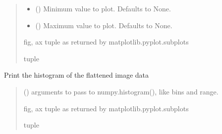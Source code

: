 \documentclass[letterpaper,10pt,english]{sphinxmanual}
\begin{document}
\begin{fulllineitems}
\begin{fulllineitems}
\begin{quote}
\begin{description}
\begin{itemize}
\item {} 
\sphinxAtStartPar
{} (\sphinxstyleliteralemphasis{\sphinxupquote{, }}) \textendash{} Minimum value to plot. Defaults to None.

\item {} 
\sphinxAtStartPar
{} (\sphinxstyleliteralemphasis{\sphinxupquote{, }}) \textendash{} Maximum value to plot. Defaults to None.

\end{itemize}

\sphinxAtStartPar
fig, ax tuple as returned by matplotlib.pyplot.subplots

\sphinxAtStartPar
tuple

\end{description}\end{quote}

\end{fulllineitems}


\begin{fulllineitems}
\label{\detokenize{micropolarray:micropolarray.image.Image.show_histogram}}
\pysigstartsignatures
{}
\pysigstopsignatures
\sphinxAtStartPar
Print the histogram of the flattened image data
\begin{quote}\begin{description}
\sphinxAtStartPar
{} (\sphinxstyleliteralemphasis{\sphinxupquote{, }}) \textendash{} arguments to pass to numpy.histogram(), like bins and range.

\sphinxAtStartPar
fig, ax tuple as returned by matplotlib.pyplot.subplots

\sphinxAtStartPar
tuple

\end{description}\end{quote}

\end{fulllineitems}


\end{fulllineitems}
\end{document}
